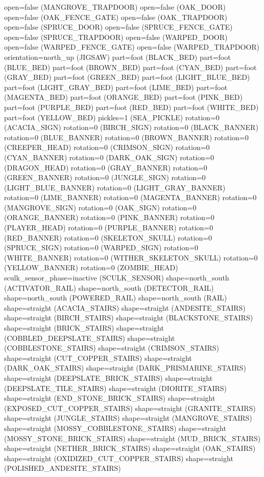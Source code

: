 \documentclass[11pt]{article}
\begin{document}
open=false (MANGROVE_TRAPDOOR)
open=false (OAK_DOOR)
open=false (OAK_FENCE_GATE)
open=false (OAK_TRAPDOOR)
open=false (SPRUCE_DOOR)
open=false (SPRUCE_FENCE_GATE)
open=false (SPRUCE_TRAPDOOR)
open=false (WARPED_DOOR)
open=false (WARPED_FENCE_GATE)
open=false (WARPED_TRAPDOOR)
orientation=north_up (JIGSAW)
part=foot (BLACK_BED)
part=foot (BLUE_BED)
part=foot (BROWN_BED)
part=foot (CYAN_BED)
part=foot (GRAY_BED)
part=foot (GREEN_BED)
part=foot (LIGHT_BLUE_BED)
part=foot (LIGHT_GRAY_BED)
part=foot (LIME_BED)
part=foot (MAGENTA_BED)
part=foot (ORANGE_BED)
part=foot (PINK_BED)
part=foot (PURPLE_BED)
part=foot (RED_BED)
part=foot (WHITE_BED)
part=foot (YELLOW_BED)
pickles=1 (SEA_PICKLE)
rotation=0 (ACACIA_SIGN)
rotation=0 (BIRCH_SIGN)
rotation=0 (BLACK_BANNER)
rotation=0 (BLUE_BANNER)
rotation=0 (BROWN_BANNER)
rotation=0 (CREEPER_HEAD)
rotation=0 (CRIMSON_SIGN)
rotation=0 (CYAN_BANNER)
rotation=0 (DARK_OAK_SIGN)
rotation=0 (DRAGON_HEAD)
rotation=0 (GRAY_BANNER)
rotation=0 (GREEN_BANNER)
rotation=0 (JUNGLE_SIGN)
rotation=0 (LIGHT_BLUE_BANNER)
rotation=0 (LIGHT_GRAY_BANNER)
rotation=0 (LIME_BANNER)
rotation=0 (MAGENTA_BANNER)
rotation=0 (MANGROVE_SIGN)
rotation=0 (OAK_SIGN)
rotation=0 (ORANGE_BANNER)
rotation=0 (PINK_BANNER)
rotation=0 (PLAYER_HEAD)
rotation=0 (PURPLE_BANNER)
rotation=0 (RED_BANNER)
rotation=0 (SKELETON_SKULL)
rotation=0 (SPRUCE_SIGN)
rotation=0 (WARPED_SIGN)
rotation=0 (WHITE_BANNER)
rotation=0 (WITHER_SKELETON_SKULL)
rotation=0 (YELLOW_BANNER)
rotation=0 (ZOMBIE_HEAD)
sculk_sensor_phase=inactive (SCULK_SENSOR)
shape=north_south (ACTIVATOR_RAIL)
shape=north_south (DETECTOR_RAIL)
shape=north_south (POWERED_RAIL)
shape=north_south (RAIL)
shape=straight (ACACIA_STAIRS)
shape=straight (ANDESITE_STAIRS)
shape=straight (BIRCH_STAIRS)
shape=straight (BLACKSTONE_STAIRS)
shape=straight (BRICK_STAIRS)
shape=straight (COBBLED_DEEPSLATE_STAIRS)
shape=straight (COBBLESTONE_STAIRS)
shape=straight (CRIMSON_STAIRS)
shape=straight (CUT_COPPER_STAIRS)
shape=straight (DARK_OAK_STAIRS)
shape=straight (DARK_PRISMARINE_STAIRS)
shape=straight (DEEPSLATE_BRICK_STAIRS)
shape=straight (DEEPSLATE_TILE_STAIRS)
shape=straight (DIORITE_STAIRS)
shape=straight (END_STONE_BRICK_STAIRS)
shape=straight (EXPOSED_CUT_COPPER_STAIRS)
shape=straight (GRANITE_STAIRS)
shape=straight (JUNGLE_STAIRS)
shape=straight (MANGROVE_STAIRS)
shape=straight (MOSSY_COBBLESTONE_STAIRS)
shape=straight (MOSSY_STONE_BRICK_STAIRS)
shape=straight (MUD_BRICK_STAIRS)
shape=straight (NETHER_BRICK_STAIRS)
shape=straight (OAK_STAIRS)
shape=straight (OXIDIZED_CUT_COPPER_STAIRS)
shape=straight (POLISHED_ANDESITE_STAIRS)
\end{document}
